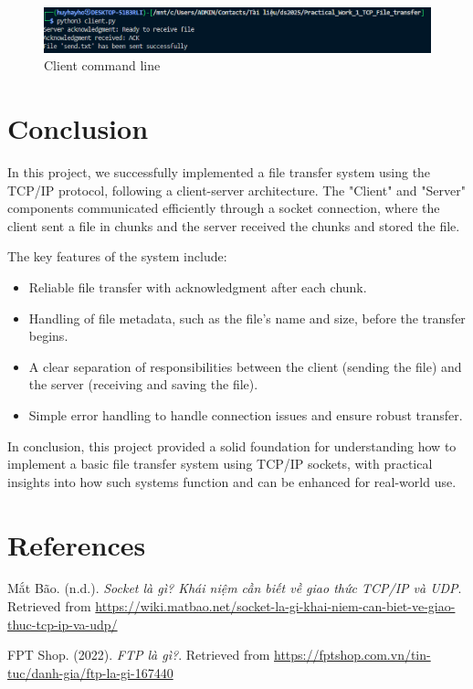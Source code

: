 \documentclass{article}
\begin{document}
\begin{figure}[h]
    \centering
    \includegraphics[width=1\linewidth]{Figure/Client.png}
    \caption{Client command line}
    \label{fig:client_command_line}
\end{figure}

\thispagestyle{empty}
    \newpage

\section{Conclusion}

In this project, we successfully implemented a file transfer system using the TCP/IP protocol, following a client-server architecture. The "Client" and "Server" components communicated efficiently through a socket connection, where the client sent a file in chunks and the server received the chunks and stored the file.

The key features of the system include:
\begin{itemize}
    \item Reliable file transfer with acknowledgment after each chunk.
    \item Handling of file metadata, such as the file's name and size, before the transfer begins.
    \item A clear separation of responsibilities between the client (sending the file) and the server (receiving and saving the file).
    \item Simple error handling to handle connection issues and ensure robust transfer.
\end{itemize}

In conclusion, this project provided a solid foundation for understanding how to implement a basic file transfer system using TCP/IP sockets, with practical insights into how such systems function and can be enhanced for real-world use.

\section{References}

\begin{thebibliography}{99}
    
     Mắt Bão. (n.d.). \textit{Socket là gì? Khái niệm cần biết về giao thức TCP/IP và UDP}. Retrieved from \url{https://wiki.matbao.net/socket-la-gi-khai-niem-can-biet-ve-giao-thuc-tcp-ip-va-udp/}
    
     FPT Shop. (2022). \textit{FTP là gì?}. Retrieved from \url{https://fptshop.com.vn/tin-tuc/danh-gia/ftp-la-gi-167440}

\end{thebibliography}
\end{document}
